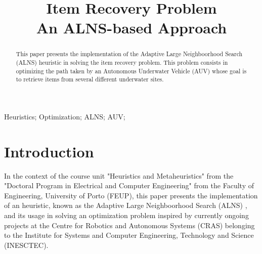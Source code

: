 \documentclass[conference]{IEEEtran}
\begin{document}
\title{Item Recovery Problem\\\huge An ALNS-based Approach\\
}

\makeatletter
\newcommand{\linebreakand}{%
  \end{@IEEEauthorhalign}
  \hfill\mbox{}\par
  \mbox{}\hfill\begin{@IEEEauthorhalign}
}
\makeatother



\DeclareRobustCommand*{\IEEEautspihorrefmark}[1]{%
  \raisebox{0pt}[0pt][0pt]{\textsuperscript{\footnotesize #1}}%
}

\author{
}


\maketitle

\begin{abstract}

This paper presents the implementation of the Adaptive Large Neighboorhood Search (ALNS) heuristic in solving the item recovery problem. This problem consists in optimizing the path taken by an Autonomous Underwater Vehicle (AUV) whose goal is to retrieve items from several different underwater sites.

\end{abstract}

\begin{IEEEkeywords}
Heuristics; Optimization; ALNS; AUV;
\end{IEEEkeywords}

\section{Introduction}

In the context of the course unit "Heuristics and Metaheuristics" from the  "Doctoral Program in Electrical and Computer Engineering" from the Faculty of Engineering, University of Porto (FEUP), this paper presents the implementation of an heuristic, known as the Adaptive Large Neighboorhood Search (ALNS) \cite{ALNS_book, ALNS_paper}, and its usage in solving an optimization problem inspired by currently ongoing projects at the Centre for Robotics and Autonomous Systems (CRAS) belonging to the Institute for Systems and Computer Engineering, Technology and Science (INESCTEC).
\end{document}
